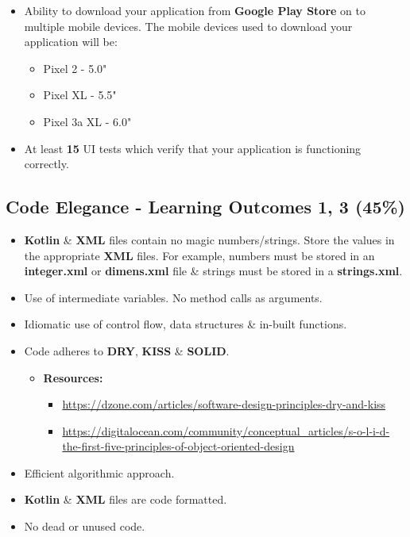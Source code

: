 \documentclass{article}
\begin{document}
\begin{itemize}
\begin{itemize}
	      \end{itemize}
	\item Ability to download your application from \textbf{Google Play Store} on to multiple mobile devices. The mobile devices used to download your application will be:
	      \begin{itemize}
		      \item Pixel 2 - 5.0"
		      \item Pixel XL - 5.5"
		      \item Pixel 3a XL - 6.0"
	      \end{itemize}
	\item At least \textbf{15} UI tests which verify that your application is functioning correctly.
\end{itemize}

\subsection*{Code Elegance - Learning Outcomes 1, 3 (45\%)}
\begin{itemize}
	\item \textbf{Kotlin} \& \textbf{XML} files contain no magic numbers/strings. Store the values in the appropriate \textbf{XML} files. For example, numbers must be stored in an \textbf{integer.xml} or \textbf{dimens.xml} file \& strings must be stored in a \textbf{strings.xml}.
	\item Use of intermediate variables. No method calls as arguments.
	\item Idiomatic use of control flow, data structures \& in-built functions.
	\item Code adheres to \textbf{DRY}, \textbf{KISS} \& \textbf{SOLID}.
	\begin{itemize}
		\item \textbf{Resources:}
		\begin{itemize}
			\item \footnotesize\href{https://dzone.com/articles/software-design-principles-dry-and-kiss}{https://dzone.com/articles/software-design-principles-dry-and-kiss}
			\item \footnotesize\href{https://digitalocean.com/community/conceptual\_articles/s-o-l-i-d-the-first-five-principles-of-object-oriented-design}{https://digitalocean.com/community/conceptual\_articles/s-o-l-i-d-the-first-five-principles-of-object-oriented-design}
		\end{itemize}
	\end{itemize}
	\item Efficient algorithmic approach.
	\item \textbf{Kotlin} \& \textbf{XML} files are code formatted.
	\item No dead or unused code.
\end{itemize}
\end{document}
